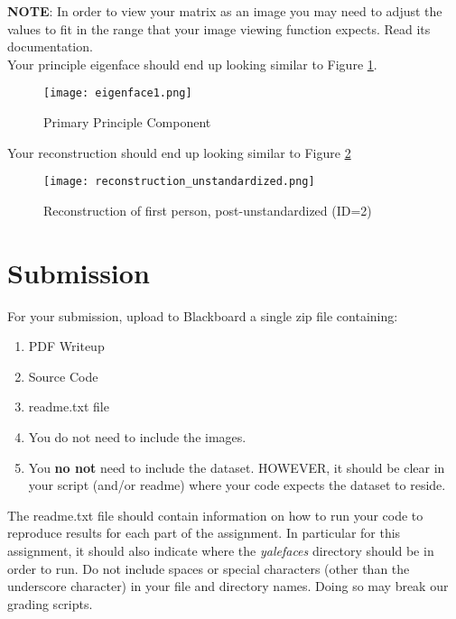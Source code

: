 \documentclass[12pt]{article}
\begin{document}
\noindent
\textbf{NOTE}:  In order to view your matrix as an image you may need to adjust the values to fit in the range that your image viewing function expects.  Read its documentation.\\

\noindent
Your principle eigenface should end up looking similar to Figure \ref{eigenface1}.
\begin{figure}[H]
\begin{center}
\texttt{[image: eigenface1.png]}
\caption{Primary Principle Component}
\label{eigenface1}
\end{center}
\end{figure}


Your reconstruction should end up looking similar to Figure \ref{recon2}

\begin{figure}[H]
\begin{center}
\texttt{[image: reconstruction\_unstandardized.png]}
\caption{Reconstruction of first person, post-unstandardized (ID=2)}
\label{recon2}
\end{center}
\end{figure}

\newpage
\section*{Submission}
For your submission, upload to Blackboard a single zip file containing:

\begin{enumerate}
\item PDF Writeup
\item Source Code
\item readme.txt file
\item You do not need to include the images.
\item You \textbf{no not} need to include the dataset.  HOWEVER, it should be clear in your script (and/or readme) where your code expects the dataset to reside.
\end{enumerate}

\noindent
The readme.txt file should contain information on how to run your code to reproduce results for each part of the assignment.  In particular for this assignment, it should also indicate where the \emph{yalefaces} directory should be in order to run.  Do not include spaces or special characters (other than the underscore character) in your file and directory names.  Doing so may break our grading scripts.\\
\end{document}
